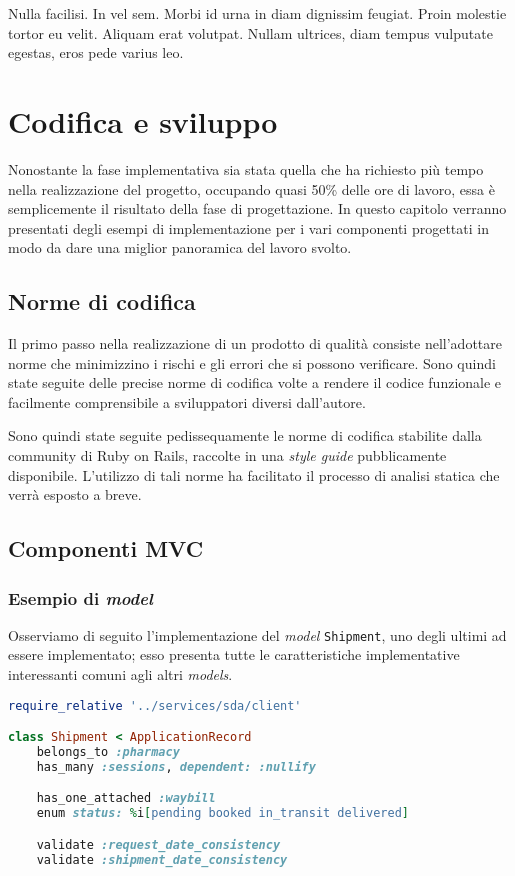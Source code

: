 
\begin{savequote}[75mm]
Nulla facilisi. In vel sem. Morbi id urna in diam dignissim feugiat. Proin molestie tortor eu velit. Aliquam erat volutpat. Nullam ultrices, diam tempus vulputate egestas, eros pede varius leo.
\end{savequote}

\chapter{Codifica e sviluppo}
Nonostante la fase implementativa sia stata quella che ha richiesto più tempo nella realizzazione del progetto, occupando quasi 50\% delle ore di lavoro, essa è semplicemente il risultato della fase di progettazione. In questo capitolo verranno presentati degli esempi di implementazione per i vari componenti progettati in modo da dare una miglior panoramica del lavoro svolto.

\section{Norme di codifica}
Il primo passo nella realizzazione di un prodotto di qualità consiste nell'adottare norme che minimizzino i rischi e gli errori che si possono verificare. Sono quindi state seguite delle precise norme di codifica volte a rendere il codice funzionale e facilmente comprensibile a sviluppatori diversi dall'autore.

Sono quindi state seguite pedissequamente le norme di codifica stabilite dalla community di Ruby on Rails, raccolte in una \textit{style guide} pubblicamente disponibile. L'utilizzo di tali norme ha facilitato il processo di analisi statica che verrà esposto a breve.

\section{Componenti MVC}
\subsection{Esempio di \textit{model}}
Osserviamo di seguito l'implementazione del \textit{model} \texttt{Shipment}, uno degli ultimi ad essere implementato; esso presenta tutte le caratteristiche implementative interessanti comuni agli altri \textit{models}.

\begin{lstlisting}[caption={\textbf{\texttt{shipment.rb}}},captionpos=b,language=Ruby]
require_relative '../services/sda/client'

class Shipment < ApplicationRecord
    belongs_to :pharmacy
    has_many :sessions, dependent: :nullify

    has_one_attached :waybill
    enum status: %i[pending booked in_transit delivered]

    validate :request_date_consistency
    validate :shipment_date_consistency
\end{lstlisting}


